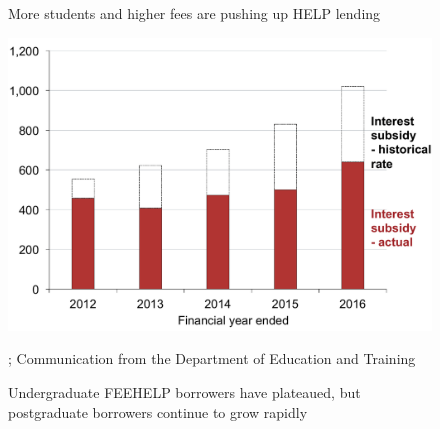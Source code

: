 \documentclass{grattan}
\begin{document}
\begin{figure}
\begin{minipage}[t][\textheight]{\columnwidth}
\vspace{\grattanfptop}
\caption[More students and higher fees are pushing up {HELP} lending]{More students and higher fees are pushing up \gls{HELP} lending}\label{fig:fig4-more-students-higher-fees-are-pushing-up-HELP-lending}
\includegraphics[page=4]{atlas/Chartpack.pdf}

%
{\textcites{EducationvariousyearsHighereducationreport}{Government2016Budget201617}{ABS2016ConsumerPriceIndex}{Birmingham2016MediareleaseNew}; Communication from the Department of Education and Training}
\end{minipage}
\hfill 
\begin{minipage}[t][\textheight]{\columnwidth}
\vspace{\grattanfptop}
\caption{Undergraduate \gls{FEEHELP} borrowers have plateaued, but postgraduate borrowers continue to grow rapidly}\label{fig:fig5-undergrad-HELP-borrowers-have-plateaued-but-postgrad-borrowers-continued-to-grow-rapidly}


\end{minipage}
\end{figure}
\end{document}
